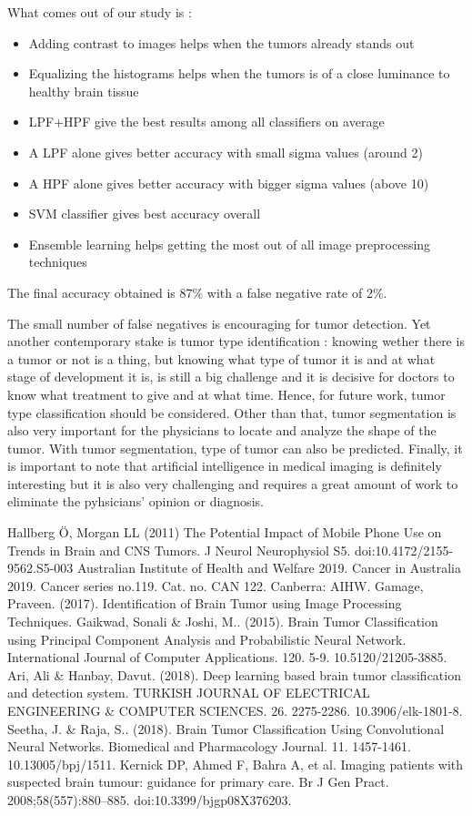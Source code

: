 \documentclass[conference]{IEEEtran}
\begin{document}
What comes out of our study is :
\begin{itemize}
\item Adding contrast to images helps when the tumors already stands out
\item Equalizing the histograms helps when the tumors is of a close luminance to healthy brain tissue
\item LPF+HPF give the best results among all classifiers on average
\item A LPF alone gives better accuracy with small sigma values (around 2)
\item A HPF alone gives better accuracy with bigger sigma values (above 10)
\item SVM classifier gives best accuracy overall
\item Ensemble learning helps getting the most out of all image preprocessing techniques
\end{itemize}
The final accuracy obtained is 87\% with a false negative rate of 2\%.

The small number of false negatives is encouraging for tumor detection. Yet another contemporary stake is tumor type identification : knowing wether there is a tumor or not is a thing, but knowing what type of tumor it is and at what stage of development it is, is still a big challenge and it is decisive for doctors to know what treatment to give and at what time. Hence, for future work, tumor type classification should be considered. Other than that, tumor segmentation is also very important for the physicians to locate and analyze the shape of the tumor. With tumor segmentation, type of tumor can also be predicted. Finally, it is important to note that artificial intelligence in medical imaging is definitely interesting but it is also very challenging and requires a great amount of work to eliminate the pyhsicians' opinion or diagnosis. 


\begin{thebibliography}{00}
 Hallberg Ö, Morgan LL (2011) The Potential Impact of Mobile Phone Use on Trends in Brain and CNS Tumors. J Neurol Neurophysiol S5. doi:10.4172/2155-9562.S5-003
 Australian Institute of Health and Welfare 2019. Cancer in Australia 2019. Cancer series no.119. Cat. no. CAN 122. Canberra: AIHW.
 Gamage, Praveen. (2017). Identification of Brain Tumor using Image Processing Techniques. 
 Gaikwad, Sonali \& Joshi, M.. (2015). Brain Tumor Classification using Principal Component Analysis and Probabilistic Neural Network. International Journal of Computer Applications. 120. 5-9. 10.5120/21205-3885.
 Ari, Ali \& Hanbay, Davut. (2018). Deep learning based brain tumor classification and detection system. TURKISH JOURNAL OF ELECTRICAL ENGINEERING \& COMPUTER SCIENCES. 26. 2275-2286. 10.3906/elk-1801-8.
 Seetha, J. \& Raja, S.. (2018). Brain Tumor Classification Using Convolutional Neural Networks. Biomedical and Pharmacology Journal. 11. 1457-1461. 10.13005/bpj/1511. 
 Kernick DP, Ahmed F, Bahra A, et al. Imaging patients with suspected brain tumour: guidance for primary care. Br J Gen Pract. 2008;58(557):880–885. doi:10.3399/bjgp08X376203.
\end{thebibliography}
\end{document}
